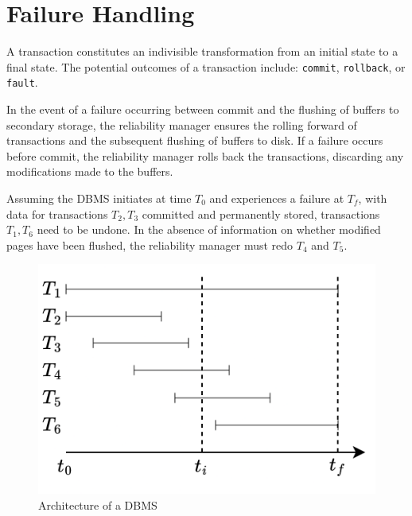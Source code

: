 \section{Failure Handling}

A transaction constitutes an indivisible transformation from an initial state to a final state. 
The potential outcomes of a transaction include: \texttt{commit}, \texttt{rollback}, or \texttt{fault}.

In the event of a failure occurring between commit and the flushing of buffers to secondary storage, the reliability manager ensures the rolling forward of transactions and the subsequent flushing of buffers to disk. 
If a failure occurs before commit, the reliability manager rolls back the transactions, discarding any modifications made to the buffers.
\begin{example}
    Assuming the DBMS initiates at time $T_0$ and experiences a failure at $T_f$, with data for transactions $T_2,T_3$ committed and permanently stored, transactions $T_1,T_6$ need to be undone.
    In the absence of information on whether modified pages have been flushed, the reliability manager must redo $T_4$ and $T_5$.
    \begin{figure}[H]
        \centering
        \includegraphics[width=0.5\linewidth]{images/tar.png}
        \caption{Architecture of a DBMS}
    \end{figure}
\end{example}

